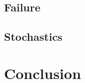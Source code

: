 \documentclass[handout,aspectratio=169]{beamer}
\begin{document}
\subsection{Failure}



\subsection{Stochastics}




\section{Conclusion}






\end{document}
